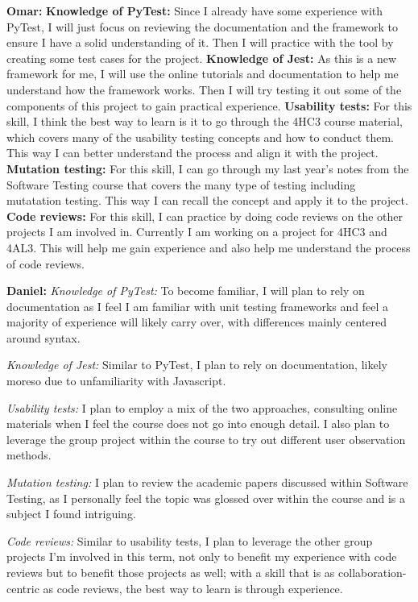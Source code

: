 \documentclass[12pt, titlepage]{article}
\begin{document}
\begin{enumerate}
  \textbf{Omar: }
  \textbf{Knowledge of PyTest:} Since I already have some experience with PyTest, I will just focus on reviewing the documentation and the framework to ensure I have a solid understanding of it. Then I will practice with the tool by creating some test cases for the project.
  \textbf{Knowledge of Jest:} As this is a new framework for me, I will use the online tutorials and documentation to help me understand how the framework works. Then I will try testing it out some of the components of this project to gain practical experience.
  \textbf{Usability tests:} For this skill, I think the best way to learn is it to go through the 4HC3 course material, which covers many of the usability testing concepts and how to conduct them. This way I can better understand the process and align it with the project.
  \textbf{Mutation testing:} For this skill, I can go through my last year's notes from the Software Testing course that covers the many type of testing including mutatation testing. This way I can recall the concept and apply it to the project.
  \textbf{Code reviews:} For this skill, I can practice by doing code reviews on the other projects I am involved in. Currently I am working on a project for 4HC3 and 4AL3. This will help me gain experience and also help me understand the process of code reviews.

  \textbf{Daniel: }
  \textit{Knowledge of PyTest:} To become familiar, I will plan to rely on documentation as I feel I am familiar with unit testing frameworks and feel a majority of experience will likely carry over, with differences mainly centered around syntax.

  \textit{Knowledge of Jest:} Similar to PyTest, I plan to rely on documentation, likely moreso due to unfamiliarity with Javascript.

  \textit{Usability tests:} I plan to employ a mix of the two approaches, consulting online materials when I feel the course does not go into enough detail. I also plan to leverage the group project within the course to try out different user observation methods.

  \textit{Mutation testing:} I plan to review the academic papers discussed within Software Testing, as I personally feel the topic was glossed over within the course and is a subject I found intriguing. 

  \textit{Code reviews:} Similar to usability tests, I plan to leverage the other group projects I'm involved in this term, not only to benefit my experience with code reviews but to benefit those projects as well; with a skill that is as collaboration-centric as code reviews, the best way to learn is through experience.
  

\end{enumerate}
\end{document}
